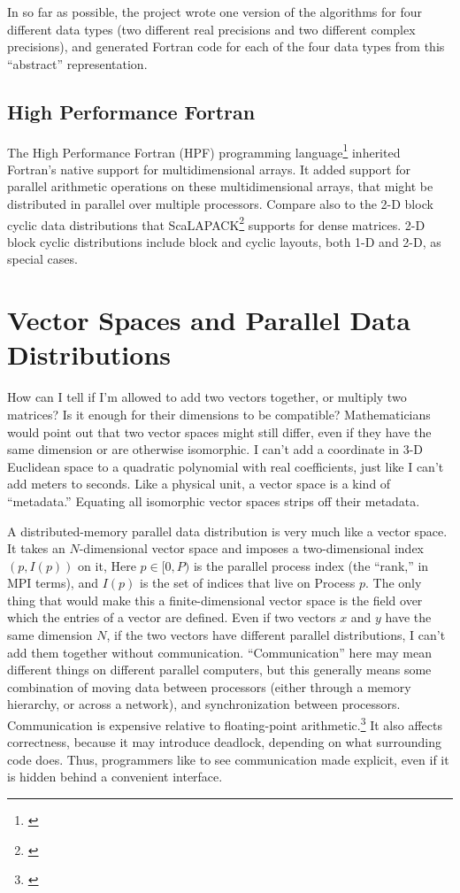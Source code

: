 In so far as possible, the project wrote one version of the algorithms for four
different data types (two different real precisions and two different complex
precisions), and generated Fortran code for each of the four data types from
this ``abstract'' representation.

\subsection{High Performance Fortran}

The High Performance Fortran (HPF) programming
language\footnote{\cite{Kennedy2007,Kennedy2011}} inherited Fortran's
native support for multidimensional arrays.  It added support for
parallel arithmetic operations on these multidimensional arrays, that
might be distributed in parallel over multiple processors.  Compare
also to the 2-D block cyclic data distributions that
ScaLAPACK\footnote{\cite{Blackford1997}} supports for dense matrices.
2-D block cyclic distributions include block and cyclic layouts, both
1-D and 2-D, as special cases.

\section{Vector Spaces and Parallel Data Distributions}

How can I tell if I'm allowed to add two vectors together, or multiply two
matrices?  Is it enough for their dimensions to be compatible?  Mathematicians
would point out that two vector spaces might still differ, even if they have the
same dimension or are otherwise isomorphic.  I can't add a coordinate in 3-D
Euclidean space to a quadratic polynomial with real coefficients, just like I
can't add meters to seconds.  Like a physical unit, a vector space is a kind of
``metadata.''  Equating all isomorphic vector spaces strips off their metadata.

A distributed-memory parallel data distribution is very much like a vector
space. It takes an $N$-dimensional vector space and imposes a two-dimensional
index $(p,I(p))$ on it, Here $p \in [0,P)$ is the parallel process index (the
``rank,'' in MPI terms), and $I(p)$ is the set of indices that live on Process
$p$. The only thing that would make this a finite-dimensional vector space is
the field over which the entries of a vector are defined. Even if two vectors
$x$ and $y$ have the same dimension $N$, if the two vectors have different
parallel distributions, I can't add them together without communication.
``Communication'' here may mean different things on different parallel computers,
but this generally means some combination of moving data between processors
(either through a memory hierarchy, or across a network), and synchronization
between processors. Communication is expensive relative to floating-point
arithmetic.\footnote{\cite{wulf1995hitting,Blackford1997}}
It also affects correctness,
because it may introduce deadlock,
depending on what surrounding code does.
Thus, programmers like to see communication made explicit,
even if it is hidden behind a convenient interface.

